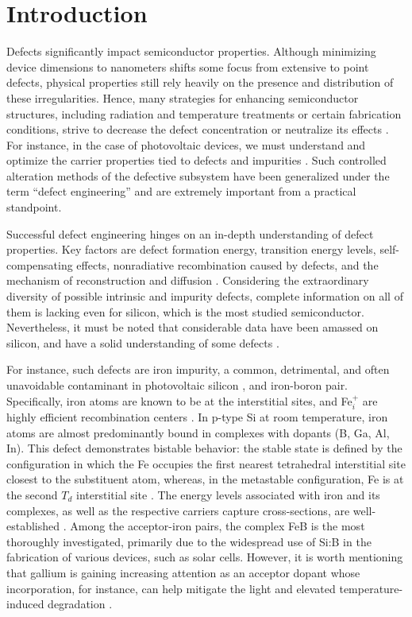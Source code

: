 \documentclass{WileyMSP-template}
\begin{document}
\section{Introduction}

Defects significantly impact semiconductor properties.
Although minimizing device dimensions to nanometers shifts some focus from extensive to point defects,
physical properties still rely heavily on the presence and distribution of these irregularities.
Hence, many strategies for enhancing semiconductor structures, including radiation and temperature treatments or certain fabrication conditions, strive to decrease the defect concentration or neutralize its effects \cite{Cai2023,Vobecky2021,Frascaroli2021}.
For instance, in the case of photovoltaic devices, we must understand and optimize the carrier properties tied to defects and impurities  \cite{Cai2023}.
Such controlled alteration methods of the defective subsystem have been generalized under the term ``defect engineering'' and are extremely important from a practical standpoint.

Successful defect engineering hinges on an in-depth understanding of defect properties.
Key factors are defect formation energy, transition energy levels, self-compensating effects, nonradiative recombination caused by defects,
and the mechanism of reconstruction and diffusion  \cite{Cai2023}.
Considering the extraordinary diversity of possible intrinsic and impurity defects, complete information on all of them is lacking even for silicon, which is the most studied semiconductor.
Nevertheless, it must be noted that considerable data have been amassed on silicon, and have a solid understanding of some defects \cite{Juhl2018}.

For instance, such defects are iron impurity, a common, detrimental, and often unavoidable contaminant
in photovoltaic silicon \cite{Frascaroli2021,Sun2021}, and iron-boron pair.
Specifically, iron atoms are known to be at the interstitial sites, and Fe$_i^+$ are highly efficient recombination centers \cite{WeberFe}.
In p-type Si at room temperature, iron atoms are almost predominantly bound in complexes with dopants (B, Ga, Al, In).
This defect demonstrates bistable behavior: the stable state is defined by the configuration in which the Fe occupies
the first nearest tetrahedral interstitial site closest to the substituent atom,
whereas, in the metastable configuration, Fe is at the second $T_d$ interstitial site \cite{FeB:PhysRevB49}.
The energy levels associated with iron and its complexes, as well as the respective carriers capture cross-sections, are well-established \cite{Juhl2018,ROUGIEUX2018}.
Among the acceptor-iron pairs, the complex FeB is the most thoroughly investigated,
primarily due to the widespread use of Si:B in the fabrication of various devices, such as solar cells.
However, it is worth mentioning that gallium is gaining increasing attention as an acceptor dopant whose incorporation,
for instance, can help mitigate the light and elevated temperature-induced degradation \cite{Ning2022}.
\end{document}
